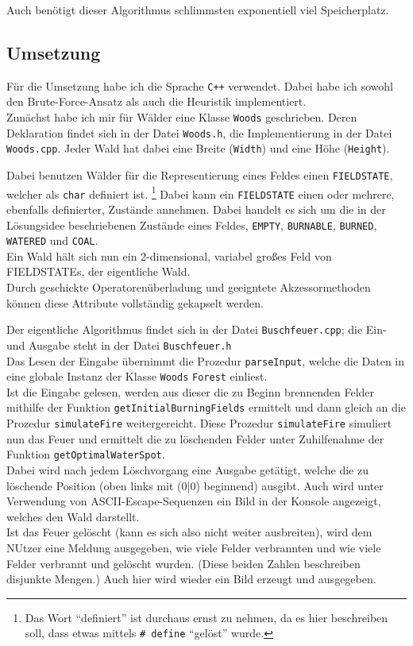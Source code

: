 Auch benötigt dieser Algorithmus schlimmsten exponentiell viel Speicherplatz.

\subsection{Umsetzung}
Für die Umsetzung habe ich die Sprache \texttt{C++} verwendet. Dabei habe ich sowohl den Brute-Force-Ansatz als auch die Heuristik implementiert.\\
Zunächst habe ich mir für Wälder eine Klasse \texttt{Woods} geschrieben. Deren Deklaration findet sich in der Datei \texttt{Woods.h}, die Implementierung in der Datei \texttt{Woods.cpp}. Jeder Wald hat dabei eine Breite (\texttt{Width}) und eine Höhe (\texttt{Height}).

Dabei benutzen Wälder für die Representierung eines Feldes einen \texttt{FIELDSTATE}, welcher als \texttt{char} definiert ist. \footnote{Das Wort \enquote{definiert} ist durchaus ernst zu nehmen, da es hier beschreiben soll, dass etwas mittels \texttt{\# define} \enquote{gelöst} wurde.} Dabei kann ein \texttt{FIELDSTATE} einen oder mehrere, ebenfalls definierter, Zustände annehmen. Dabei handelt es sich um die in der Lösungsidee beschriebenen Zustände eines Feldes, \texttt{EMPTY}, \texttt{BURNABLE}, \texttt{BURNED}, \texttt{WATERED} und \texttt{COAL}.\\

Ein Wald hält sich nun ein 2-dimensional, variabel großes Feld von FIELDSTATEs, der eigentliche Wald.\\
Durch geschickte Operatorenüberladung und geeigntete Akzessormethoden können diese Attribute vollständig gekapselt werden.

Der eigentliche Algorithmus findet sich in der Datei \texttt{Buschfeuer.cpp}; die Ein- und Ausgabe steht in der Datei \texttt{Buschfeuer.h}\\
Das Lesen der Eingabe übernimmt die Prozedur \texttt{parseInput}, welche die Daten in eine globale Instanz der Klasse \texttt{Woods} \texttt{Forest} einliest.\\
Ist die Eingabe gelesen, werden aus dieser die zu Beginn brennenden Felder mithilfe der Funktion \texttt{getInitialBurningFields} ermittelt und dann gleich an die Prozedur \texttt{simulateFire} weitergereicht. Diese Prozedur \texttt{simulateFire} simuliert nun das Feuer und ermittelt die zu löschenden Felder unter Zuhilfenahme der Funktion \texttt{getOptimalWaterSpot}.\\
Dabei wird nach jedem Löschvorgang eine Ausgabe getätigt, welche die zu löschende Position (oben links mit (0|0) beginnend) ausgibt. Auch wird unter Verwendung von ASCII-Escape-Sequenzen ein Bild in der Konsole angezeigt, welches den Wald darstellt.\\
Ist das Feuer gelöscht (kann es sich also nicht weiter ausbreiten), wird dem NUtzer eine Meldung ausgegeben, wie viele Felder verbrannten und wie viele Felder verbrannt und gelöscht wurden. (Diese beiden Zahlen beschreiben disjunkte Mengen.) Auch hier wird wieder ein Bild erzeugt und ausgegeben.


